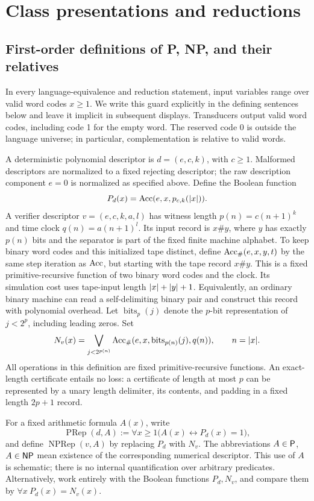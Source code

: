 \section{Class presentations and reductions}
\label{sec:classes}

\subsection{First-order definitions of P, NP, and their relatives}

In every language-equivalence and reduction statement, input variables range
over valid word codes \(x\ge1\). We write this guard explicitly in the
defining sentences below and leave it implicit in subsequent displays.
Transducers output valid word codes, including code 1 for the empty word.
The reserved code 0 is outside the language universe; in particular,
complementation is relative to valid words.

A deterministic polynomial descriptor is \(d=(e,c,k)\), with \(c\ge1\).
Malformed descriptors are normalized to a fixed rejecting descriptor;
the raw description component \(e=0\) is normalized as specified above.
Define the Boolean function
\[
 P_d(x)=\operatorname{Acc}(e,x,p_{c,k}(\lvert x\rvert)).
\]
A verifier descriptor \(v=(e,c,k,a,l)\) has witness length
\(p(n)=c(n+1)^k\) and time clock \(q(n)=a(n+1)^l\). Its input record is
\(x\#y\), where \(y\) has exactly \(p(n)\) bits and the separator is part
of the fixed finite machine alphabet. To keep binary word codes and this
initialized tape distinct, define \(\operatorname{Acc}_{\#}(e,x,y,t)\) by the same step
iteration as \(\operatorname{Acc}\), but starting with the tape record \(x\#y\).
This is a fixed primitive-recursive function of two binary word codes and
the clock. Its simulation cost uses tape-input length \(\lvert x\rvert+\lvert y\rvert+1\).
Equivalently, an ordinary binary machine can read a self-delimiting binary
pair and construct this record with polynomial overhead.
Let \(\operatorname{bits}_p(j)\)
denote the \(p\)-bit representation of \(j<2^p\), including leading zeros.
Set
\[
 N_v(x)=\bigvee_{j<2^{p(n)}}
 \operatorname{Acc}_{\#}(e,x,\operatorname{bits}_{p(n)}(j),q(n)),\qquad n=\lvert x\rvert.
\]
All operations in this definition are fixed primitive-recursive functions.
An exact-length certificate entails no loss: a certificate of length at most
\(p\) can be represented by a unary length delimiter, its contents, and
padding in a fixed length \(2p+1\) record.

\begin{definition}
For a fixed arithmetic formula \(A(x)\), write
\[
 \operatorname{PRep}(d,A):=\forall x\ge1\bigl(A(x)\leftrightarrow P_d(x)=1\bigr),
\]
and define \(\operatorname{NPRep}(v,A)\) by replacing \(P_d\) with \(N_v\).
The abbreviations \(A\in\mathsf P\), \(A\in\mathsf{NP}\) mean existence of the
corresponding numerical descriptor. This use of \(A\) is schematic; there is
no internal quantification over arbitrary predicates. Alternatively, work
entirely with the Boolean functions \(P_d,N_v\), and compare them by
\(\forall x\ P_d(x)=N_v(x)\).
\end{definition}

